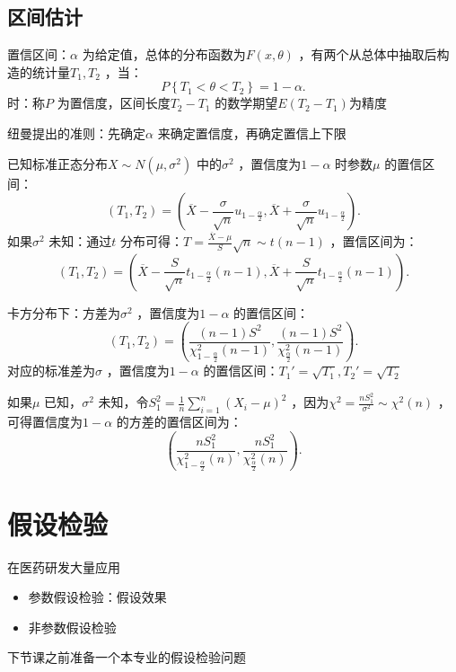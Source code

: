 \subsection{区间估计}%
\label{sub:区间估计}
\begin{defi}
    置信区间：$\alpha$ 为给定值，总体的分布函数为$F\left( x,\theta \right)$ ，有两个从总体中抽取后构造的统计量$T_1,T_2$ ，当：\[
        P\left\{ T_1<\theta<T_2 \right\}=1-\alpha
    .\]
    时：称$P$ 为置信度，区间长度$T_2-T_1$ 的数学期望$E\left( T_2-T_1 \right)$为精度
\end{defi}
纽曼提出的准则：先确定$\alpha$ 来确定置信度，再确定置信上下限
\begin{notation}
    已知标准正态分布$X\sim N\left( \mu,\sigma^2  \right)$ 中的$\sigma^2 $ ，置信度为$1-\alpha$ 时参数$\mu$ 的置信区间：\[
        \left( T_1,T_2 \right)=\left( \overline{X}-\frac{\sigma}{\sqrt{n}}u_{1-\frac{\alpha}{2}},\overline{X}+\frac{\sigma}{\sqrt{n}}u_{1-\frac{\alpha}{2}} \right)
    .\]
    如果$\sigma^2 $ 未知：通过$t$ 分布可得：$T=\frac{\overline{X}-\mu}{S}\sqrt{n}\sim t\left( n-1 \right)$ ，置信区间为：\[
        \left( T_1,T_2 \right)=\left( \overline{X}-\frac{S}{\sqrt{n}}t_{1-\frac{\alpha}{2}}\left( n-1 \right),\overline{X}+\frac{S}{\sqrt{n}}t_{1-\frac{\alpha}{2}}\left( n-1 \right) \right)
    .\]
\end{notation}
\begin{notation}
卡方分布下：方差为$\sigma^2 $ ，置信度为$1-\alpha$ 的置信区间：\[
    \left( T_1,T_2 \right)=\left( \frac{\left( n-1 \right)S^2 }{\chi^2 _{1-\frac{\alpha}{2}}\left( n-1 \right)},\frac{\left( n-1 \right)S^2 }{\chi^2 _{\frac{\alpha}{2}}\left( n-1 \right)} \right)
.\]
对应的标准差为$\sigma$ ，置信度为$1-\alpha$ 的置信区间：$T_1'=\sqrt{T_1},T_2'=\sqrt{T_2}$

如果$\mu$ 已知，$\sigma^2 $ 未知，令$S_1^2 =\frac{1}{n}\sum_{i=1}^{n} \left( X_{i}-\mu \right)^2 $ ，因为$\chi^2 =\frac{nS_1^2 }{\sigma^2 }\sim \chi^2 \left( n \right)$ ，可得置信度为$1-\alpha$ 的方差的置信区间为：\[
    \left( \frac{nS_1^2 }{\chi^2 _{1-\frac{\alpha}{2}}\left( n \right)},\frac{nS_1^2 }{\chi^2 _{\frac{\alpha}{2}}\left( n \right)} \right)
.\] 
\end{notation}
\section{假设检验}%
\label{sec:假设检验}
\begin{notation}
    在医药研发大量应用
\end{notation}
\begin{itemize}
    \item 参数假设检验：假设效果
    \item 非参数假设检验
\end{itemize}
\begin{notation}
    下节课之前准备一个本专业的假设检验问题
\end{notation}
